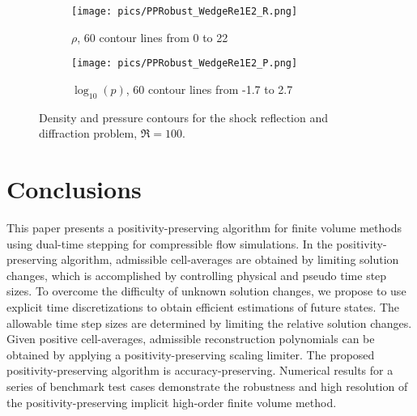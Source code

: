 \begin{figure}[htbp]
    \centering
    \begin{subfigure}{0.5\textwidth}
        \texttt{[image: pics/PPRobust\_WedgeRe1E2\_R.png]}
        \caption[]{$\rho$, 60 contour lines from 0 to 22}
    \end{subfigure}\hfill
    \begin{subfigure}{0.5\textwidth}
        \texttt{[image: pics/PPRobust\_WedgeRe1E2\_P.png]}
        \caption[]{$\log_{10}(p)$, 60 contour lines from -1.7 to 2.7}
    \end{subfigure}
    \caption{Density and pressure contours for the shock reflection and diffraction problem, $\Re=100$.}
    \label{fig:wedgeRe1E2}
\end{figure}


\section{Conclusions}
\label{sec:Conclusions}

This paper presents a positivity-preserving algorithm for finite volume methods using dual-time stepping for compressible flow simulations. In the positivity-preserving algorithm, admissible cell-averages are obtained by limiting solution changes, which is accomplished by controlling physical and pseudo time step sizes. To overcome the difficulty of unknown solution changes, we propose to use explicit time discretizations to obtain efficient estimations of future states. The allowable time step sizes are determined by limiting the relative solution changes. Given positive cell-averages, admissible reconstruction polynomials can be obtained by applying a positivity-preserving scaling limiter. The proposed positivity-preserving algorithm is accuracy-preserving. Numerical results for a series of benchmark test cases demonstrate the robustness and high resolution of the positivity-preserving implicit high-order finite volume method. 

